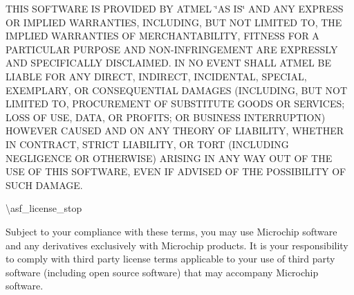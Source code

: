 T\+H\+IS S\+O\+F\+T\+W\+A\+RE IS P\+R\+O\+V\+I\+D\+ED BY A\+T\+M\+EL \char`\"{}\+A\+S I\+S\char`\"{} A\+ND A\+NY E\+X\+P\+R\+E\+SS OR I\+M\+P\+L\+I\+ED W\+A\+R\+R\+A\+N\+T\+I\+ES, I\+N\+C\+L\+U\+D\+I\+NG, B\+UT N\+OT L\+I\+M\+I\+T\+ED TO, T\+HE I\+M\+P\+L\+I\+ED W\+A\+R\+R\+A\+N\+T\+I\+ES OF M\+E\+R\+C\+H\+A\+N\+T\+A\+B\+I\+L\+I\+TY, F\+I\+T\+N\+E\+SS F\+OR A P\+A\+R\+T\+I\+C\+U\+L\+AR P\+U\+R\+P\+O\+SE A\+ND N\+O\+N-\/\+I\+N\+F\+R\+I\+N\+G\+E\+M\+E\+NT A\+RE E\+X\+P\+R\+E\+S\+S\+LY A\+ND S\+P\+E\+C\+I\+F\+I\+C\+A\+L\+LY D\+I\+S\+C\+L\+A\+I\+M\+ED. IN NO E\+V\+E\+NT S\+H\+A\+LL A\+T\+M\+EL BE L\+I\+A\+B\+LE F\+OR A\+NY D\+I\+R\+E\+CT, I\+N\+D\+I\+R\+E\+CT, I\+N\+C\+I\+D\+E\+N\+T\+AL, S\+P\+E\+C\+I\+AL, E\+X\+E\+M\+P\+L\+A\+RY, OR C\+O\+N\+S\+E\+Q\+U\+E\+N\+T\+I\+AL D\+A\+M\+A\+G\+ES (I\+N\+C\+L\+U\+D\+I\+NG, B\+UT N\+OT L\+I\+M\+I\+T\+ED TO, P\+R\+O\+C\+U\+R\+E\+M\+E\+NT OF S\+U\+B\+S\+T\+I\+T\+U\+TE G\+O\+O\+DS OR S\+E\+R\+V\+I\+C\+ES; L\+O\+SS OF U\+SE, D\+A\+TA, OR P\+R\+O\+F\+I\+TS; OR B\+U\+S\+I\+N\+E\+SS I\+N\+T\+E\+R\+R\+U\+P\+T\+I\+ON) H\+O\+W\+E\+V\+ER C\+A\+U\+S\+ED A\+ND ON A\+NY T\+H\+E\+O\+RY OF L\+I\+A\+B\+I\+L\+I\+TY, W\+H\+E\+T\+H\+ER IN C\+O\+N\+T\+R\+A\+CT, S\+T\+R\+I\+CT L\+I\+A\+B\+I\+L\+I\+TY, OR T\+O\+RT (I\+N\+C\+L\+U\+D\+I\+NG N\+E\+G\+L\+I\+G\+E\+N\+CE OR O\+T\+H\+E\+R\+W\+I\+SE) A\+R\+I\+S\+I\+NG IN A\+NY W\+AY O\+UT OF T\+HE U\+SE OF T\+H\+IS S\+O\+F\+T\+W\+A\+RE, E\+V\+EN IF A\+D\+V\+I\+S\+ED OF T\+HE P\+O\+S\+S\+I\+B\+I\+L\+I\+TY OF S\+U\+CH D\+A\+M\+A\+GE.

\textbackslash{}asf\+\_\+license\+\_\+stop

Subject to your compliance with these terms, you may use Microchip software and any derivatives exclusively with Microchip products. It is your responsibility to comply with third party license terms applicable to your use of third party software (including open source software) that may accompany Microchip software.

